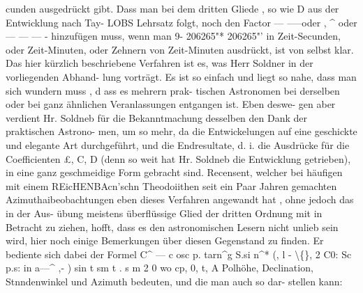 \documentclass[12pt,a4paper]{article}
\begin{document}
cunden ausgedrückt gibt. Dass man bei dem dritten Gliede , so wie D aus der Entwicklung nach Tay-\newline
LOBS Lehrsatz folgt, noch den Factor --- -----\quotedblbase  oder , \^{} \quotedblbase  oder --- --- --- - hinzufügen muss, wenn man 9- 206265"* 206265"'\newline
in Zeit-Secunden, oder Zeit-Minuten, oder Zehnern von Zeit-Minuten ausdrückt, ist von selbst klar.\newline
Das hier kürzlich beschriebene Verfahren ist es, was Herr Soldner in der vorliegenden Abhand-\newline
lung vorträgt. Es ist so einfach und liegt so nahe, dass man sich wundern muss , d ass es mehrern prak-\newline
tischen Astronomen bei derselben oder bei ganz ähnlichen Veranlassungen entgangen ist. Eben deswe-\newline
gen aber verdient Hr. Soldneb für die Bekanntmachung desselben den Dank der praktischen Astrono-\newline
men, um so mehr, da die Entwickelungen auf eine geschickte und elegante Art durchgeführt, und die\newline
Endresultate, d. i. die Ausdrücke für die Coefficienten £, C, D (denn so weit hat Hr. Soldneb die\newline
Entwicklung getrieben), in eine ganz geschmeidige Form gebracht sind.\newline
Recensent, welcher bei häufigen mit einem REicHENBAcn'schn Theodoiithen seit ein Paar Jahren\newline
gemachten Azimuthaibeobachtungen eben dieses Verfahren angewandt hat , ohne jedoch das in der Aus-\newline
übung meistens überflüssige Glied der dritten Ordnung mit in Betracht zu ziehen, hofft, dass es den\newline
astronomischen Lesern nicht unlieb sein wird, hier noch einige Bemerkungen über diesen Gegenstand\newline
zu finden. Er bediente sich dabei der Formel C\^{} --- c osc p. tarn\^{}g S.si n\^{}* (, l - \textbackslash\{\}, 2 C0: Sc p.s: in a---\^{} ,- )\newline
sin t sm t . s m 2 0\newline
wo cp, 0, t, A Polhöhe, Declination, Stnndenwinkel und Azimuth bedeuten, und die man auch so dar-\newline
stellen kann:\newline
\end{document}
